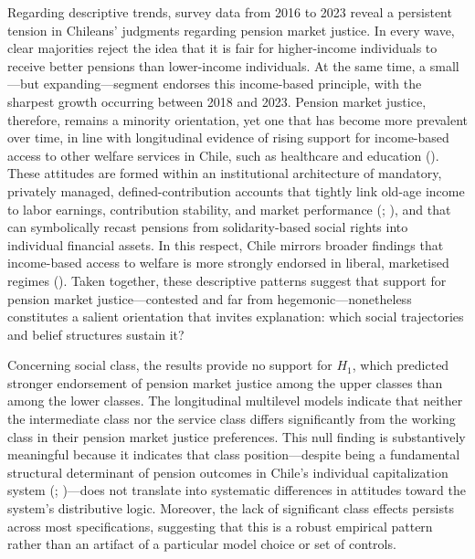 \documentclass[
  12pt,
]{article}
\begin{document}
Regarding descriptive trends, survey data from 2016 to 2023 reveal a
persistent tension in Chileans' judgments regarding pension market
justice. In every wave, clear majorities reject the idea that it is fair
for higher-income individuals to receive better pensions than
lower-income individuals. At the same time, a small---but
expanding---segment endorses this income-based principle, with the
sharpest growth occurring between 2018 and 2023. Pension market justice,
therefore, remains a minority orientation, yet one that has become more
prevalent over time, in line with longitudinal evidence of rising
support for income-based access to other welfare services in Chile, such
as healthcare and education
(). These
attitudes are formed within an institutional architecture of mandatory,
privately managed, defined-contribution accounts that tightly link
old-age income to labor earnings, contribution stability, and market
performance (; ), and that
can symbolically recast pensions from solidarity-based social rights
into individual financial assets. In this respect, Chile mirrors broader
findings that income-based access to welfare is more strongly endorsed
in liberal, marketised regimes (). Taken together, these descriptive patterns suggest that support
for pension market justice---contested and far from
hegemonic---nonetheless constitutes a salient orientation that invites
explanation: which social trajectories and belief structures sustain it?

Concerning social class, the results provide no support for \(H_1\),
which predicted stronger endorsement of pension market justice among the
upper classes than among the lower classes. The longitudinal multilevel
models indicate that neither the intermediate class nor the service
class differs significantly from the working class in their pension
market justice preferences. This null finding is substantively
meaningful because it indicates that class position---despite being a
fundamental structural determinant of pension outcomes in Chile's
individual capitalization system
(;
)---does not translate into systematic differences in attitudes
toward the system's distributive logic. Moreover, the lack of
significant class effects persists across most specifications,
suggesting that this is a robust empirical pattern rather than an
artifact of a particular model choice or set of controls.
\end{document}
